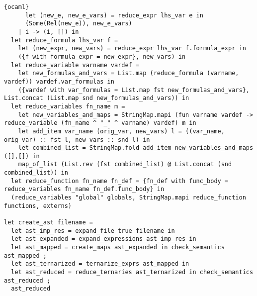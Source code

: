 \begin{lstlisting}{ocaml}
      let (new_e, new_e_vars) = reduce_expr lhs_var e in
      (Some(Rel(new_e)), new_e_vars)
    | i -> (i, []) in
  let reduce_formula lhs_var f =
    let (new_expr, new_vars) = reduce_expr lhs_var f.formula_expr in
    ({f with formula_expr = new_expr}, new_vars) in
  let reduce_variable varname vardef =
    let new_formulas_and_vars = List.map (reduce_formula (varname, vardef)) vardef.var_formulas in
    ({vardef with var_formulas = List.map fst new_formulas_and_vars}, List.concat (List.map snd new_formulas_and_vars)) in
  let reduce_variables fn_name m =
    let new_variables_and_maps = StringMap.mapi (fun varname vardef -> reduce_variable (fn_name ^ "_" ^ varname) vardef) m in
    let add_item var_name (orig_var, new_vars) l = ((var_name, orig_var) :: fst l, new_vars :: snd l) in
    let combined_list = StringMap.fold add_item new_variables_and_maps ([],[]) in
    map_of_list (List.rev (fst combined_list) @ List.concat (snd combined_list)) in
  let reduce_function fn_name fn_def = {fn_def with func_body = reduce_variables fn_name fn_def.func_body} in
  (reduce_variables "global" globals, StringMap.mapi reduce_function functions, externs)

let create_ast filename =
  let ast_imp_res = expand_file true filename in
  let ast_expanded = expand_expressions ast_imp_res in
  let ast_mapped = create_maps ast_expanded in check_semantics ast_mapped ;
  let ast_ternarized = ternarize_exprs ast_mapped in
  let ast_reduced = reduce_ternaries ast_ternarized in check_semantics ast_reduced ;
  ast_reduced
\end{lstlisting}
